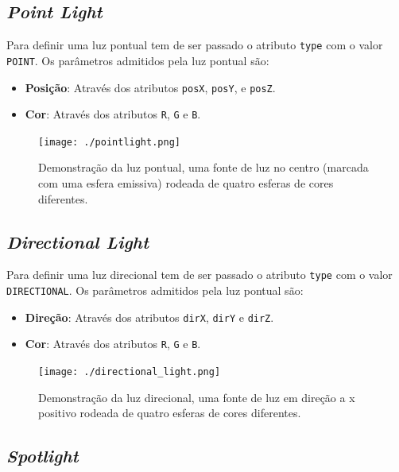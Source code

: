\documentclass[a4paper]{article}
\begin{document}
\subsection{\textit{Point Light}}

Para definir uma luz pontual tem de ser passado o atributo \texttt{type} com o
valor \texttt{POINT}. Os parâmetros admitidos pela luz pontual são:

\begin{itemize}
    \item \textbf{Posição}: Através dos atributos \texttt{posX}, \texttt{posY},
        e \texttt{posZ}.
    \item \textbf{Cor}: Através dos atributos \texttt{R}, \texttt{G} e
        \texttt{B}.
\end{itemize}

\begin{figure}[H]
    \centering
    \texttt{[image: ./pointlight.png]}
    \caption{Demonstração da luz pontual, uma fonte de luz no centro (marcada
    com uma esfera emissiva) rodeada de quatro esferas de cores diferentes.}
\end{figure}

\subsection{\textit{Directional Light}}

Para definir uma luz direcional tem de ser passado o atributo \texttt{type}
com o valor \texttt{DIRECTIONAL}. Os parâmetros admitidos pela luz pontual são:

\begin{itemize}
    \item \textbf{Direção}: Através dos atributos \texttt{dirX}, \texttt{dirY}
        e \texttt{dirZ}.
    \item \textbf{Cor}: Através dos atributos \texttt{R}, \texttt{G} e
        \texttt{B}.
\end{itemize}

\begin{figure}[H]
    \centering
    \texttt{[image: ./directional\_light.png]}
    \caption{Demonstração da luz direcional, uma fonte de luz em direção a x
    positivo rodeada de quatro esferas de cores diferentes.}
\end{figure}

\subsection{\textit{Spotlight}}
\end{document}

